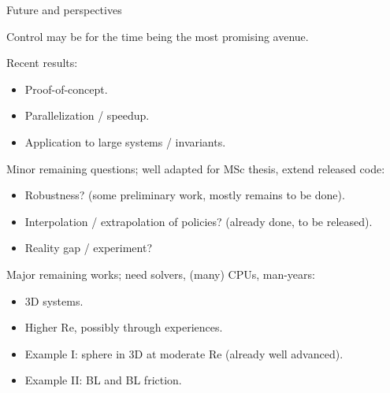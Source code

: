 \documentclass{beamer}
\begin{document}
\begin{frame}{Future and perspectives}

Control may be for the time being the most promising avenue.

Recent results:

\begin{itemize}
    \item Proof-of-concept.
    \item Parallelization / speedup.
    \item Application to large systems / invariants.
\end{itemize}

Minor remaining questions; well adapted for MSc thesis, extend released code:

\begin{itemize}
    \item Robustness? (some preliminary work, mostly remains to be done).
    \item Interpolation / extrapolation of policies? (already done, to be released).
    \item Reality gap / experiment?
\end{itemize}

Major remaining works; need solvers, (many) CPUs, man-years:

\begin{itemize}
    \item 3D systems.
    \item Higher Re, possibly through experiences.
    \item Example I: sphere in 3D at moderate Re (already well advanced).
    \item Example II: BL and BL friction.
\end{itemize}

\end{frame}


\end{document}
